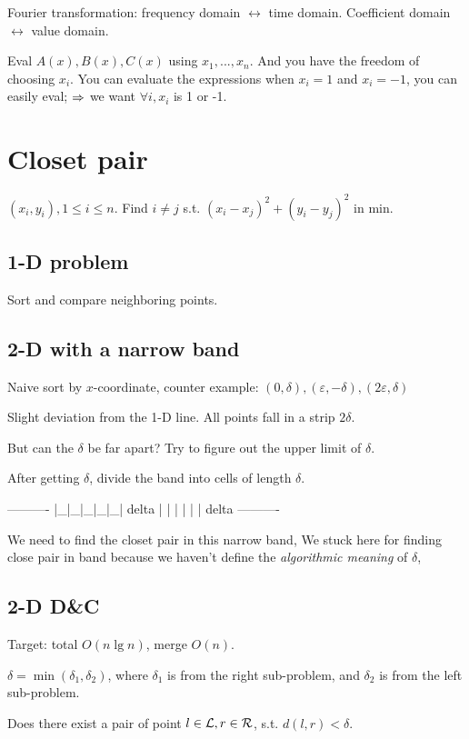 \documentclass[a4paper]{report}
\begin{document}
Fourier transformation: frequency domain $\leftrightarrow$ time domain. Coefficient domain $\leftrightarrow$ value domain. 

Eval $A(x), B(x), C(x)$ using $x_1, ..., x_n$. And you have the freedom of choosing $x_i$. You can evaluate the expressions when  $x_i=1$ and $x_i=-1$, you can easily eval; $\Rightarrow$ we want $\forall i, x_i$ is 1 or -1. 

\section{Closet pair}
$(x_i, y_i), 1\leq i \leq n$. Find $i\neq j$ s.t. $(x_i-x_j)^2+(y_i-y_j)^2$ in min.

\subsection{1-D problem} 
Sort and compare neighboring points. 

\subsection{2-D with a narrow band}
Naive sort by $x$-coordinate, counter example: $(0, \delta), (\varepsilon,-\delta), (2\varepsilon,\delta)$

Slight deviation from the 1-D line. All points fall in a strip $2\delta$. 

But can the $\delta$ be far apart? Try to figure out the upper limit of $\delta$.

After getting $\delta$, divide the band into cells of length $\delta$. 
\begin{python}
----------
|_|_|_|_|_| delta
| | | | | | delta 
----------
\end{python}

We need to find the closet pair in this narrow band, We stuck here for finding close pair in band because we haven't define the \textit{algorithmic meaning} of $\delta$, 

\subsection{2-D D\&C} 
Target: total $O(n \lg n)$, merge $O(n)$. 

$\delta = \min(\delta_1, \delta_2)$, where $\delta_1$ is from the right sub-problem, and $\delta_2$ is from the left sub-problem. 

Does there exist a pair of point $l \in \mathcal{L}, r \in \mathcal{R}$, s.t. $d(l, r) <\delta$. 
\end{document}
